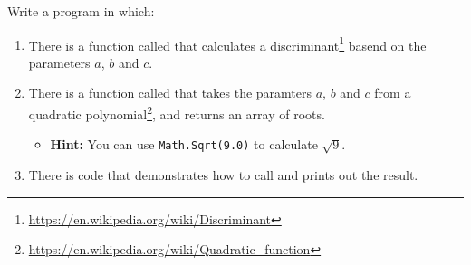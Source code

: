 Write a program in which:
\begin{enumerate}
  \item There is a function called  that calculates a discriminant\footnote{\url{https://en.wikipedia.org/wiki/Discriminant}} basend on the parameters $a$, $b$ and $c$.
  \item There is a function called  that takes the paramters $a$, $b$ and $c$ from a quadratic polynomial\footnote{\url{https://en.wikipedia.org/wiki/Quadratic_function}}, and returns an array of roots.
    \begin{itemize}
      \item \textbf{Hint:} You can use \texttt{Math.Sqrt(9.0)} to calculate $\sqrt{9}$.
    \end{itemize}
  \item There is code that demonstrates how to call  and prints out the result.
\end{enumerate}

